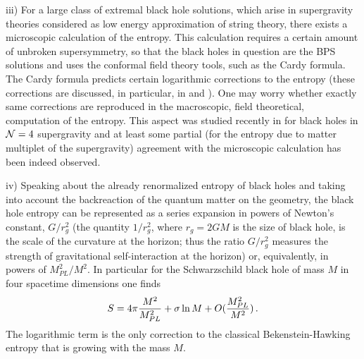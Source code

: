 \documentclass[12pt]{article}
\def\be{\begin{eqnarray}}
\def\ee{\end{eqnarray}}
\def\lb{\label}
\def\o{\over}
\begin{document}
 

\medskip

\noindent iii) For a large class of extremal black hole solutions, which arise in supergravity theories considered as low energy approximation of string theory, there exists
a microscopic calculation of the entropy. This calculation requires a certain amount of unbroken supersymmetry, so that the black holes in question are the BPS solutions and uses the conformal field theory tools, such as the Cardy formula. 
The Cardy formula predicts certain logarithmic corrections to the entropy (these corrections are discussed, in particular,  in \cite{Carlip:2000nv} and \cite{Solodukhin:1997yy}). One may worry whether exactly same corrections are reproduced in the macroscopic, field theoretical, 
computation of the entropy. This aspect was studied recently in  \cite{Banerjee:2010qc} for black holes in ${\cal N}=4$ supergravity and  at least some partial (for the entropy due to matter multiplet of the supergravity)  agreement with the microscopic calculation has been indeed observed.


\medskip


\noindent iv) Speaking about the already renormalized entropy of black holes and taking into account the backreaction of the quantum matter on the geometry, the black hole entropy 
can be represented as a series expansion in powers of Newton's constant, $G/r_g^2$ (the quantity $1/r_g^2$,  where $r_g=2GM$ is the size of black hole, is the scale of the curvature at the horizon; thus the ratio $G/r^2_g$ measures the strength of gravitational self-interaction at the horizon) or, equivalently, in powers of  $M^2_{PL}/M^2$. In particular for the Schwarzschild
black hole of mass $M$ in four spacetime dimensions  one finds
\be
S=4\pi {M^2\o M^2_{PL}}+\sigma\ln M +O({M^2_{PL}\o M^2})\, .
\lb{entropy M}
\ee 
The logarithmic term is the only correction to the classical Bekenstein-Hawking entropy  that is growing with the mass $M$. 


\medskip
\end{document}
